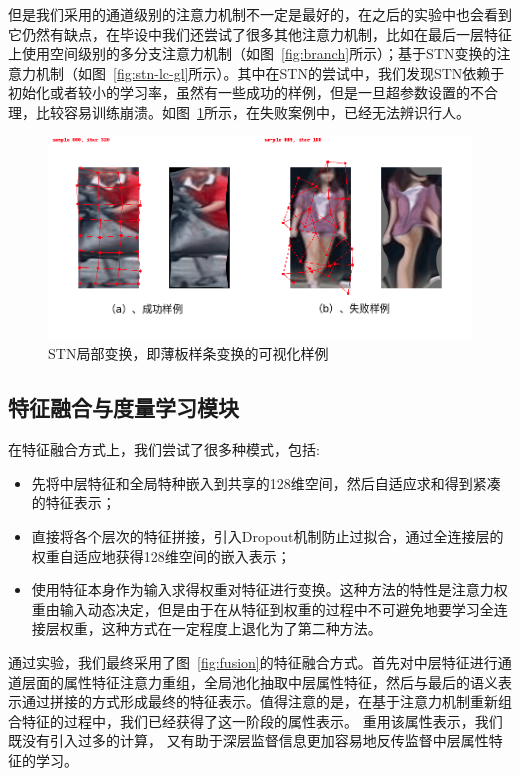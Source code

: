 但是我们采用的通道级别的注意力机制不一定是最好的，在之后的实验中也会看到它仍然有缺点，在毕设中我们还尝试了很多其他注意力机制，比如在最后一层特征上使用空间级别的多分支注意力机制（如图~\ref{fig:branch}所示）；基于STN变换的注意力机制（如图~\ref{fig:stn-lc-gl}所示）。其中在STN的尝试中，我们发现STN依赖于初始化或者较小的学习率，虽然有一些成功的样例，但是一旦超参数设置的不合理，比较容易训练崩溃。如图~\ref{fig:stn-lc-fail}所示，在失败案例中，已经无法辨识行人。

\begin{figure}
	\centering
	\includegraphics[width=\textwidth]{fig/2018-05-19-23-06-12.png}
	\caption{STN局部变换，即薄板样条变换的可视化样例} \label{fig:stn-lc-fail}
\end{figure}

\subsection{特征融合与度量学习模块}

在特征融合方式上，我们尝试了很多种模式，包括:
\begin{itemize}
	\item 先将中层特征和全局特种嵌入到共享的128维空间，然后自适应求和得到紧凑的特征表示；
	\item 直接将各个层次的特征拼接，引入Dropout机制防止过拟合，通过全连接层的权重自适应地获得128维空间的嵌入表示；
	\item 使用特征本身作为输入求得权重对特征进行变换。这种方法的特性是注意力权重由输入动态决定，但是由于在从特征到权重的过程中不可避免地要学习全连接层权重，这种方式在一定程度上退化为了第二种方法。
\end{itemize}

通过实验，我们最终采用了图~\ref{fig:fusion}的特征融合方式。首先对中层特征进行通道层面的属性特征注意力重组，全局池化抽取中层属性特征，然后与最后的语义表示通过拼接的方式形成最终的特征表示。值得注意的是，在基于注意力机制重新组合特征的过程中，我们已经获得了这一阶段的属性表示。
重用该属性表示，我们既没有引入过多的计算，
又有助于深层监督信息更加容易地反传监督中层属性特征的学习。


